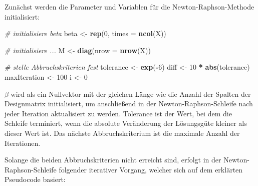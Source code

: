 \documentclass[12pt,]{article}
\newenvironment{Shaded}{\begin{snugshade}}{\end{snugshade}}
\newcommand{\KeywordTok}[1]{\textcolor[rgb]{0.13,0.29,0.53}{\textbf{#1}}}
\newcommand{\DataTypeTok}[1]{\textcolor[rgb]{0.13,0.29,0.53}{#1}}
\newcommand{\DecValTok}[1]{\textcolor[rgb]{0.00,0.00,0.81}{#1}}
\newcommand{\StringTok}[1]{\textcolor[rgb]{0.31,0.60,0.02}{#1}}
\newcommand{\CommentTok}[1]{\textcolor[rgb]{0.56,0.35,0.01}{\textit{#1}}}
\newcommand{\OperatorTok}[1]{\textcolor[rgb]{0.81,0.36,0.00}{\textbf{#1}}}
\newcommand{\NormalTok}[1]{#1}
\begin{document}
Zunächst werden die Parameter und Variablen für die
Newton-Raphson-Methode initialisiert:

\begin{Shaded}
\begin{Highlighting}[]
\CommentTok{# initialisiere beta}
\NormalTok{beta <-}\StringTok{ }\KeywordTok{rep}\NormalTok{(}\DecValTok{0}\NormalTok{, }\DataTypeTok{times =} \KeywordTok{ncol}\NormalTok{(X))}

\CommentTok{# initialisiere ...}
\NormalTok{M <-}\StringTok{ }\KeywordTok{diag}\NormalTok{(}\DataTypeTok{nrow =} \KeywordTok{nrow}\NormalTok{(X))}

\CommentTok{# stelle Abbruchskriterien fest}
\NormalTok{tolerance <-}\StringTok{ }\KeywordTok{exp}\NormalTok{(}\OperatorTok{-}\DecValTok{6}\NormalTok{)}
\NormalTok{diff <-}\StringTok{ }\DecValTok{10} \OperatorTok{*}\StringTok{ }\KeywordTok{abs}\NormalTok{(tolerance)}
\NormalTok{maxIteration <-}\StringTok{ }\DecValTok{100}
\NormalTok{i <-}\StringTok{ }\DecValTok{0}
\end{Highlighting}
\end{Shaded}

\(\beta\) wird als ein Nullvektor mit der gleichen Länge wie die Anzahl
der Spalten der Designmatrix initialisiert, um anschließend in der
Newton-Raphson-Schleife nach jeder Iteration aktualisiert zu werden.
Tolerance ist der Wert, bei dem die Schleife terminiert, wenn die
absolute Veränderung der Lösungsgüte kleiner als dieser Wert ist. Das
nächste Abbruchskriterium ist die maximale Anzahl der Iterationen.

Solange die beiden Abbruchskriterien nicht erreicht sind, erfolgt in der
Newton-Raphson-Schleife folgender iterativer Vorgang, welcher sich auf
dem erklärten Pseudocode basiert:
\end{document}
